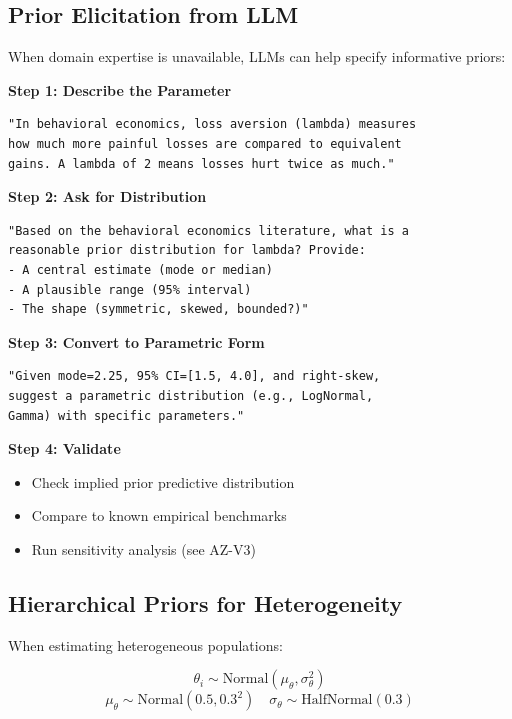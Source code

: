 \subsection{Prior Elicitation from LLM}

\begin{tcolorbox}[colback=blue!5!white, colframe=blue!75!black,
    title=LLM-Based Prior Elicitation Protocol]
When domain expertise is unavailable, LLMs can help specify informative priors:

\textbf{Step 1: Describe the Parameter}
\begin{verbatim}
"In behavioral economics, loss aversion (lambda) measures
how much more painful losses are compared to equivalent
gains. A lambda of 2 means losses hurt twice as much."
\end{verbatim}

\textbf{Step 2: Ask for Distribution}
\begin{verbatim}
"Based on the behavioral economics literature, what is a
reasonable prior distribution for lambda? Provide:
- A central estimate (mode or median)
- A plausible range (95% interval)
- The shape (symmetric, skewed, bounded?)"
\end{verbatim}

\textbf{Step 3: Convert to Parametric Form}
\begin{verbatim}
"Given mode=2.25, 95% CI=[1.5, 4.0], and right-skew,
suggest a parametric distribution (e.g., LogNormal,
Gamma) with specific parameters."
\end{verbatim}

\textbf{Step 4: Validate}
\begin{itemize}[nosep]
\item Check implied prior predictive distribution
\item Compare to known empirical benchmarks
\item Run sensitivity analysis (see AZ-V3)
\end{itemize}
\end{tcolorbox}

\subsection{Hierarchical Priors for Heterogeneity}

When estimating heterogeneous populations:

\begin{equation}
\theta_i \sim \text{Normal}(\mu_\theta, \sigma_\theta^2)
\end{equation}
\begin{equation}
\mu_\theta \sim \text{Normal}(0.5, 0.3^2) \quad \sigma_\theta \sim \text{HalfNormal}(0.3)
\end{equation}

